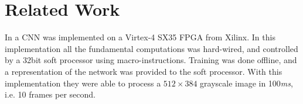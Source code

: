 \chapter{Related Work}

In \cite{Farabet2009} a CNN was implemented on a Virtex-4 SX35 FPGA from Xilinx. In this implementation all the fundamental computations was hard-wired, and controlled by a 32bit soft processor using macro-instructions. Training was done offline, and a representation of the network was provided to the soft processor. With this implementation they were able to process a $ 512 \times 384 $ grayscale image in 100\textit{ms}, i.e. 10 frames per second. 
